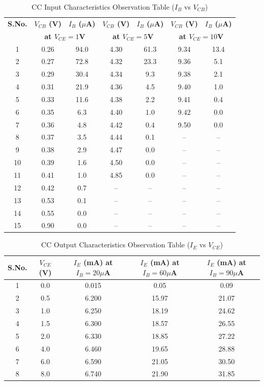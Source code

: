 \documentclass[11pt,a4paper]{article}
\begin{document}
\begin{longtable}{c c c c c c c}
\caption{CC Input Characteristics Observation Table ($I_B$ vs $V_{CB}$)}\label{tab:cc_input_readings_exp}\\
\toprule
\textbf{S.No.} & \textbf{$V_{CB}$ (V)} & \textbf{$I_B$ ($\mu$A)} & \textbf{$V_{CB}$ (V)} & \textbf{$I_B$ ($\mu$A)} & \textbf{$V_{CB}$ (V)} & \textbf{$I_B$ ($\mu$A)} \\
 & \multicolumn{2}{c}{\textbf{at $V_{CE}=1$V}} & \multicolumn{2}{c}{\textbf{at $V_{CE}=5$V}} & \multicolumn{2}{c}{\textbf{at $V_{CE}=10$V}} \\
\midrule
\endhead
1 & 0.26 & 94.0 & 4.30 & 61.3 & 9.34 & 13.4 \\
2 & 0.27 & 72.8 & 4.32 & 23.3 & 9.36 & 5.1 \\
3 & 0.29 & 30.4 & 4.34 & 9.3  & 9.38 & 2.1 \\
4 & 0.31 & 21.9 & 4.36 & 4.5  & 9.40 & 1.0 \\
5 & 0.33 & 11.6 & 4.38 & 2.2  & 9.41 & 0.4 \\
6 & 0.35 & 6.3  & 4.40 & 1.0  & 9.42 & 0.0 \\
7 & 0.36 & 4.8  & 4.42 & 0.4  & 9.50 & 0.0 \\
8 & 0.37 & 3.5  & 4.44 & 0.1  & --   & --  \\
9 & 0.38 & 2.9  & 4.47 & 0.0  & --   & --  \\
10 & 0.39 & 1.6 & 4.50 & 0.0  & --   & --  \\
11 & 0.41 & 1.0 & 4.85 & 0.0  & --   & --  \\
12 & 0.42 & 0.7 & --   & --   & --   & --  \\
13 & 0.53 & 0.1 & --   & --   & --   & --  \\
14 & 0.55 & 0.0 & --   & --   & --   & --  \\
15 & 0.90 & 0.0 & --   & --   & --   & --  \\
\bottomrule
\end{longtable}
\begin{longtable}{c c c c c}
\caption{CC Output Characteristics Observation Table ($I_E$ vs $V_{CE}$)}\label{tab:cc_output_readings_exp}\\
\toprule
\textbf{S.No.} & \textbf{$V_{CE}$ (V)} & \textbf{$I_E$ (mA) at $I_B=20\mu$A} & \textbf{$I_E$ (mA) at $I_B=60\mu$A} & \textbf{$I_E$ (mA) at $I_B=90\mu$A} \\
\midrule
\endhead
1 & 0.0 & 0.015 & 0.05  & 0.09  \\
2 & 0.5 & 6.200 & 15.97 & 21.07 \\
3 & 1.0 & 6.250 & 18.19 & 24.62 \\
4 & 1.5 & 6.300 & 18.57 & 26.55 \\
5 & 2.0 & 6.330 & 18.85 & 27.22 \\
6 & 4.0 & 6.460 & 19.65 & 28.88 \\
7 & 6.0 & 6.590 & 21.05 & 30.50 \\
8 & 8.0 & 6.740 & 21.90 & 31.85 \\
\bottomrule
\end{longtable}
\end{document}

